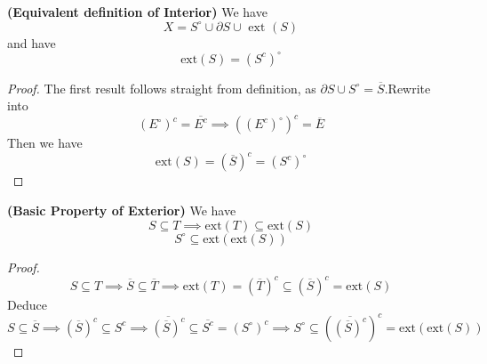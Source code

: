 \documentclass{report}
\begin{document}
\begin{theorem}
\label{2.2.17}
\textbf{(Equivalent definition of Interior)} We have
\begin{equation*}
X=S^\circ \cup \partial S\cup \text{ ext }(S)
\end{equation*}
and have
\begin{equation*}
\text{ext}(S)=(S^c)^\circ 
\end{equation*}
\end{theorem}
\begin{proof}
The first result follows straight from definition, as $\partial S\cup S^\circ =\overline{S}$.Rewrite  into
\begin{equation*}
  (E^\circ )^c =\overline{E^c}\implies ((E^c)^\circ )^c=\overline{E}
\end{equation*}
Then we have
\begin{equation*}
\text{ext}(S)=(\overline{S})^c=(S^c)^\circ 
\end{equation*}
\end{proof}
\begin{theorem}
\label{2.2.18}
\textbf{(Basic Property of Exterior)} We have
\begin{equation*}
S\subseteq T \implies  \text{ext}(T)\subseteq \text{ext}(S)
\end{equation*}
\begin{equation*}
S^\circ  \subseteq \text{ext}(\text{ext}(S))
\end{equation*}
\end{theorem}
\begin{proof}
\begin{equation*}
S\subseteq T\implies \overline{S}\subseteq \overline{T}\implies \text{ext}(T)=(\overline{T})^c\subseteq (\overline{S})^c=\text{ext}(S)
\end{equation*}
Deduce
\begin{equation*}
S\subseteq \overline{S}\implies (\overline{S})^c \subseteq S^c\implies \overline{(\overline{S})^c}\subseteq \overline{S^c}=(S^\circ )^c\implies S^\circ \subseteq (\overline{(\overline{S})^c})^c=\text{ext}(\text{ext}(S))
\end{equation*}
\end{proof}
\end{document}
